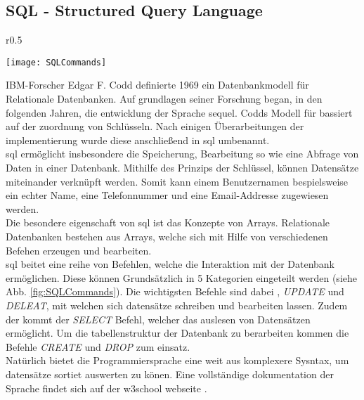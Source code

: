 \subsection{SQL - Structured Query Language}
\begin{wrapfigure}{r}{0.5\textwidth}
    \vspace{-1.2cm}
    \begin{center}
      \texttt{[image: SQLCommands]}
    \end{center}
    \vspace{-0.5cm}
    \caption{SQL Befehls Kategorien \cite{SQLCommands}}
    \label{fig:SQLCommands}
    \vspace{-0.5cm}
  \end{wrapfigure}
IBM-Forscher Edgar F. Codd definierte 1969 ein Datenbankmodell für Relationale Datenbanken. Auf grundlagen seiner Forschung began, in den folgenden Jahren, die entwicklung der Sprache \ac{sequel}. Codds Modell für bassiert auf der zuordnung von Schlüsseln. Nach einigen Überarbeitungen der implementierung wurde diese anschließend in \ac{sql} umbenannt.\\
\ac{sql} ermöglicht insbesondere die Speicherung, Bearbeitung so wie eine Abfrage von Daten in einer Datenbank. Mithilfe des Prinzips der Schlüssel, können Datensätze miteinander verknüpft werden. Somit kann einem Benutzernamen bespielsweise ein echter Name, eine Telefonnummer und eine Email-Addresse zugewiesen werden.\\
Die besondere eigenschaft von \ac{sql} ist das Konzepte von Arrays. Relationale Datenbanken bestehen aus Arrays, welche sich mit Hilfe von verschiedenen Befehen erzeugen und bearbeiten. \cite{SQL}\\
\ac{sql} beitet eine reihe von Befehlen, welche die Interaktion mit der Datenbank ermöglichen. Diese können Grundsätzlich in 5 Kategorien eingeteilt werden (siehe Abb. \ref{fig:SQLCommands}). Die wichtigsten Befehle sind dabei , \textit{UPDATE} und \textit{DELEAT}, mit welchen sich datensätze schreiben und bearbeiten lassen. Zudem der kommt der \textit{SELECT} Befehl, welcher das auslesen von Datensätzen ermöglicht. Um die tabellenstruktur der Datenbank zu berarbeiten kommen die Befehle \textit{CREATE} und \textit{DROP} zum einsatz. \cite{SQLCommands}\\
Natürlich bietet die Programmiersprache eine weit aus komplexere Sysntax, um datensätze sortiet auswerten zu könen. Eine vollständige dokumentation der Sprache findet sich auf der w3school webseite \cite{SQLDoku}.